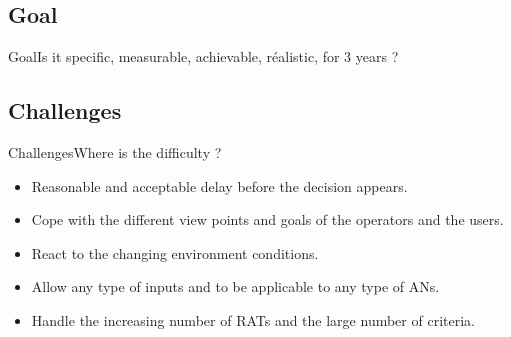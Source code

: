 \subsection*{Goal}
\begin{frame}{Goal}{Is it specific, measurable, achievable, réalistic, for 3 years ?}
\end{frame}


\subsection*{Challenges}
\begin{frame}[bg]{Challenges}{Where is the difficulty ?}
\begin{itemize}
	\item Reasonable and acceptable delay before the decision appears.
	\item Cope with the different view points and goals of the operators and the users.
	\item React to the changing environment conditions.
	\item Allow any type of inputs and to be applicable to any type of ANs.
	\item Handle the increasing number of RATs and the large number of criteria.
\end{itemize}

\end{frame}




